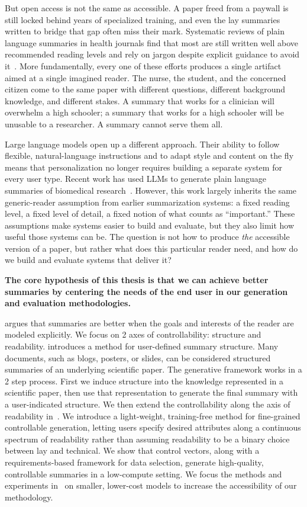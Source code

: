But open access is not the same as accessible. A paper freed from a paywall is still locked behind years of specialized training, and even the lay summaries written to bridge that gap often miss their mark. Systematic reviews of plain language summaries in health journals find that most are still written well above recommended reading levels and rely on jargon despite explicit guidance to avoid it~\cite{Gainey2024ArePL}. More fundamentally, every one of these efforts produces a single artifact aimed at a single imagined reader. The nurse, the student, and the concerned citizen come to the same paper with different questions, different background knowledge, and different stakes. A summary that works for a clinician will overwhelm a high schooler; a summary that works for a high schooler will be unusable to a researcher. A summary cannot serve them all.
 
Large language models open up a different approach. Their ability to follow flexible, natural-language instructions and to adapt style and content on the fly means that personalization no longer requires building a separate system for every user type. Recent work has used LLMs to generate plain language summaries of biomedical research~\cite{Guo2020AutomatedLL,luo2022readability}. However, this work largely inherits the same generic-reader assumption from earlier summarization systems: a fixed reading level, a fixed level of detail, a fixed notion of what counts as ``important.'' These assumptions make systems easier to build and evaluate, but they also limit how useful those systems can be. The question is not how to produce \emph{the} accessible version of a paper, but rather what does this particular reader need, and how do we build and evaluate systems that deliver it?
 
\textbf{The core hypothesis of this thesis is that we can achieve better summaries by centering the needs of the end user in our generation and evaluation methodologies.}
 
 argues that summaries are better when the goals and interests of the reader are modeled explicitly. We focus on 2 axes of controllability: structure and readability.  introduces a method for user-defined summary structure. Many documents, such as blogs, posters, or slides, can be considered structured summaries of an underlying scientific paper. The generative framework works in a 2 step process. First we induce structure into the knowledge represented in a scientific paper, then use that representation to generate the final summary with a user-indicated structure. We then extend the controllability along the axis of readability in~. We introduce a light-weight, training-free method for fine-grained controllable generation, letting users specify desired attributes along a continuous spectrum of readability rather than assuming readability to be a binary choice between lay and technical. We show that control vectors, along with a requirements-based framework for data selection, generate high-quality, controllable summaries in a low-compute setting. We focus the methods and experiments in~ on smaller, lower-cost models to increase the accessibility of our methodology.
 
